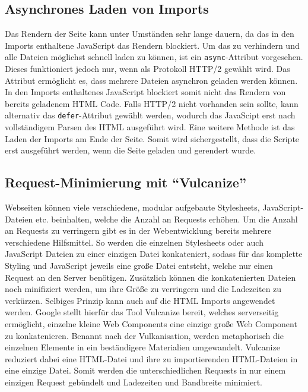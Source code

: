 \subsection{Asynchrones Laden von Imports}\label{asynchrones-laden-von-imports}

Das Rendern der Seite kann unter Umständen sehr lange dauern, da das in den Imports enthaltene JavaScript das Rendern blockiert. Um das zu verhindern und alle Dateien möglichst schnell laden zu können, ist ein \texttt{async}-Attribut vorgesehen. Dieses funktioniert jedoch nur, wenn als Protokoll HTTP/2 gewählt wird. Das Attribut ermöglicht es, dass mehrere Dateien asynchron geladen werden können. In den Imports enthaltenes JavaScript blockiert somit nicht das Rendern von bereits geladenem HTML Code. Falls HTTP/2 nicht vorhanden sein sollte, kann alternativ das \texttt{defer}-Attribut gewählt werden, wodurch das JavaScipt erst nach vollständigem Parsen des HTML ausgeführt wird. Eine weitere Methode ist das Laden der Imports am Ende der Seite. Somit wird sichergestellt, dass die Scripte erst ausgeführt werden, wenn die Seite geladen und gerendert wurde.


\subsection{\texorpdfstring{Request-Minimierung mit ``Vulcanize''}{Request-Minimierung mit Vulcanize}}\label{request-minimierung-mit-vulcanize}

Webseiten können viele verschiedene, modular aufgebaute Stylesheets, JavaScript-Dateien etc. beinhalten, welche die Anzahl an Requests erhöhen. Um die Anzahl an Requests zu verringern gibt es in der Webentwicklung bereits mehrere verschiedene Hilfsmittel. So werden die einzelnen Stylesheets oder auch JavaScript Dateien zu einer einzigen Datei konkateniert, sodass für das komplette Styling und JavaScript jeweils eine große Datei entsteht, welche nur einen Request an den Server benötigen. Zusätzlich können die konkatenierten Dateien noch minifiziert werden, um ihre Größe zu verringern und die Ladezeiten zu verkürzen. Selbiges Prinzip kann auch auf die HTML Imports angewendet werden. Google stellt hierfür das Tool Vulcanize \cite{citeulike:13879681} bereit, welches serverseitig ermöglicht, einzelne kleine Web Components eine einzige große Web Component zu konkatenieren. Benannt nach der Vulkanisation, werden metaphorisch die einzelnen Elemente in ein beständigere Materialien umgewandelt. Vulcanize reduziert dabei eine HTML-Datei und ihre zu importierenden HTML-Dateien in eine einzige Datei. Somit werden die unterschiedlichen Requests in nur einem einzigen Request gebündelt und Ladezeiten und Bandbreite minimiert.


